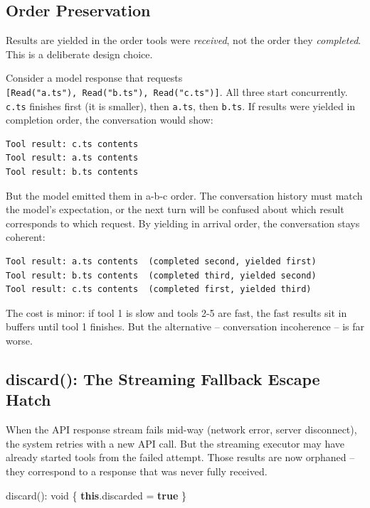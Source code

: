 \documentclass[
  english,
  11pt,
  letterpaper,
]{book}
\newenvironment{Shaded}{\begin{snugshade}}{\end{snugshade}}
\newcommand{\AttributeTok}[1]{\textcolor[rgb]{0.40,0.45,0.13}{#1}}
\newcommand{\DataTypeTok}[1]{\textcolor[rgb]{0.68,0.00,0.00}{#1}}
\newcommand{\FunctionTok}[1]{\textcolor[rgb]{0.28,0.35,0.67}{#1}}
\newcommand{\KeywordTok}[1]{\textcolor[rgb]{0.00,0.23,0.31}{\textbf{#1}}}
\newcommand{\NormalTok}[1]{\textcolor[rgb]{0.00,0.23,0.31}{#1}}
\newcommand{\OperatorTok}[1]{\textcolor[rgb]{0.37,0.37,0.37}{#1}}
\begin{document}
\subsection{Order Preservation}\label{order-preservation}

Results are yielded in the order tools were \emph{received}, not the
order they \emph{completed}. This is a deliberate design choice.

Consider a model response that requests
\texttt{{[}Read("a.ts"),\ Read("b.ts"),\ Read("c.ts"){]}}. All three
start concurrently. \texttt{c.ts} finishes first (it is smaller), then
\texttt{a.ts}, then \texttt{b.ts}. If results were yielded in completion
order, the conversation would show:

\begin{verbatim}
Tool result: c.ts contents
Tool result: a.ts contents
Tool result: b.ts contents
\end{verbatim}

But the model emitted them in a-b-c order. The conversation history must
match the model's expectation, or the next turn will be confused about
which result corresponds to which request. By yielding in arrival order,
the conversation stays coherent:

\begin{verbatim}
Tool result: a.ts contents  (completed second, yielded first)
Tool result: b.ts contents  (completed third, yielded second)
Tool result: c.ts contents  (completed first, yielded third)
\end{verbatim}

The cost is minor: if tool 1 is slow and tools 2-5 are fast, the fast
results sit in buffers until tool 1 finishes. But the alternative --
conversation incoherence -- is far worse.

\subsection{discard(): The Streaming Fallback Escape
Hatch}\label{discard-the-streaming-fallback-escape-hatch}

When the API response stream fails mid-way (network error, server
disconnect), the system retries with a new API call. But the streaming
executor may have already started tools from the failed attempt. Those
results are now orphaned -- they correspond to a response that was never
fully received.

\begin{Shaded}
\begin{Highlighting}[]
\FunctionTok{discard}\NormalTok{()}\OperatorTok{:} \DataTypeTok{void}\NormalTok{ \{}
  \KeywordTok{this}\OperatorTok{.}\AttributeTok{discarded} \OperatorTok{=} \KeywordTok{true}
\NormalTok{\}}
\end{Highlighting}
\end{Shaded}
\end{document}
